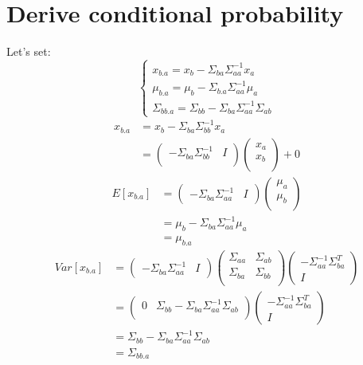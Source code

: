 \documentclass{report}
\begin{document}
\section{Derive conditional probability}
Let's set:
$$
\begin{cases}
x_{b.a}=x_b - \Sigma_{ba} \Sigma_{aa}^{-1} x_a \\
\mu_{b.a} = \mu_b - \Sigma_{b.a} \Sigma_{aa}^{-1} \mu_a \\
\Sigma_{bb.a}=\Sigma_{bb} - \Sigma_{ba} \Sigma_{aa}^{-1} \Sigma_{ab}
\end{cases}
$$
$$
\begin{aligned}
x_{b.a} &= x_b - \Sigma_{ba} \Sigma_{bb}^{-1} x_a \\
&=
\left (
\begin{matrix}
- \Sigma_{ba} \Sigma_{bb}^{-1} & I\\
\end{matrix}
\right )
\left (
\begin{matrix}
x_a \\
x_b \\
\end{matrix}
\right ) + 0
\end{aligned}
$$
$$
\begin{aligned}
E[x_{b.a}]
&=
\left (
\begin{matrix}
-\Sigma_{ba} \Sigma_{aa}^{-1} & I
\end{matrix}
\right )
\left (
\begin{matrix}
\mu_a \\
\mu_b \\
\end{matrix}
\right )\\
&=\mu_b - \Sigma_{ba} \Sigma_{aa}^{-1} \mu_a\\
&=\mu_{b.a}
\end{aligned}
$$
$$
\begin{aligned}
Var[x_{b.a}]
&= \left ( \begin{matrix}
-\Sigma_{ba} \Sigma_{aa}^{-1} & I
\end{matrix} \right )
\left ( \begin{matrix}
\Sigma_{aa} & \Sigma_{ab} \\
\Sigma_{ba} & \Sigma_{bb} \\
\end{matrix} \right )
\left ( \begin{matrix}
-\Sigma_{aa}^{-1} \Sigma_{ba}^T \\
I
\end{matrix} \right ) \\
&=\left ( \begin{matrix}
0 & \Sigma_{bb} - \Sigma_{ba} \Sigma_{aa}^{-1} \Sigma_{ab} \\
\end{matrix} \right ) 
\left ( \begin{matrix}
-\Sigma_{aa}^{-1} \Sigma_{ba}^T \\
I
\end{matrix} \right ) \\
&=\Sigma_{bb} - \Sigma_{ba} \Sigma_{aa}^{-1} \Sigma_{ab}\\
&=\Sigma_{bb.a}
\end{aligned}
$$
\end{document}
